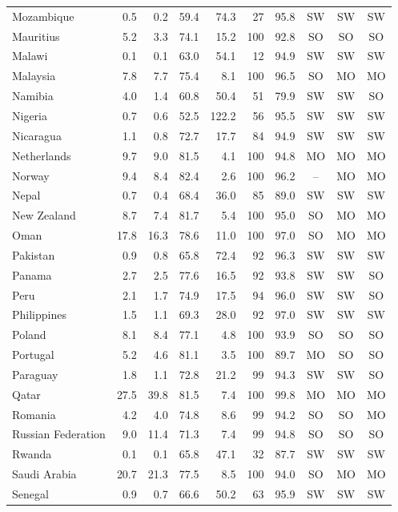 \begin{longtable}{@{}lrrrrrrccc@{}}
Mozambique & 0.5 & 0.2 & 59.4 & 74.3 & 27 & 95.8 & SW & SW & SW \\
Mauritius & 5.2 & 3.3 & 74.1 & 15.2 & 100 & 92.8 & SO & SO & SO \\
Malawi & 0.1 & 0.1 & 63.0 & 54.1 & 12 & 94.9 & SW & SW & SW \\
Malaysia & 7.8 & 7.7 & 75.4 & 8.1 & 100 & 96.5 & SO & MO & MO \\
Namibia & 4.0 & 1.4 & 60.8 & 50.4 & 51 & 79.9 & SW & SW & SO \\
Nigeria & 0.7 & 0.6 & 52.5 & 122.2 & 56 & 95.5 & SW & SW & SW \\
Nicaragua & 1.1 & 0.8 & 72.7 & 17.7 & 84 & 94.9 & SW & SW & SW \\
Netherlands & 9.7 & 9.0 & 81.5 & 4.1 & 100 & 94.8 & MO & MO & MO \\
Norway & 9.4 & 8.4 & 82.4 & 2.6 & 100 & 96.2 & -- & MO & MO \\
Nepal & 0.7 & 0.4 & 68.4 & 36.0 & 85 & 89.0 & SW & SW & SW \\
New Zealand & 8.7 & 7.4 & 81.7 & 5.4 & 100 & 95.0 & SO & MO & MO \\
Oman & 17.8 & 16.3 & 78.6 & 11.0 & 100 & 97.0 & SO & MO & MO \\
Pakistan & 0.9 & 0.8 & 65.8 & 72.4 & 92 & 96.3 & SW & SW & SW \\
Panama & 2.7 & 2.5 & 77.6 & 16.5 & 92 & 93.8 & SW & SW & SO \\
Peru & 2.1 & 1.7 & 74.9 & 17.5 & 94 & 96.0 & SW & SW & SO \\
Philippines & 1.5 & 1.1 & 69.3 & 28.0 & 92 & 97.0 & SW & SW & SW \\
Poland & 8.1 & 8.4 & 77.1 & 4.8 & 100 & 93.9 & SO & SO & SO \\
Portugal & 5.2 & 4.6 & 81.1 & 3.5 & 100 & 89.7 & MO & SO & SO \\
Paraguay & 1.8 & 1.1 & 72.8 & 21.2 & 99 & 94.3 & SW & SW & SO \\
Qatar & 27.5 & 39.8 & 81.5 & 7.4 & 100 & 99.8 & MO & MO & MO \\
Romania & 4.2 & 4.0 & 74.8 & 8.6 & 99 & 94.2 & SO & SO & MO \\
Russian Federation & 9.0 & 11.4 & 71.3 & 7.4 & 99 & 94.8 & SO & SO & SO \\
Rwanda & 0.1 & 0.1 & 65.8 & 47.1 & 32 & 87.7 & SW & SW & SW \\
Saudi Arabia & 20.7 & 21.3 & 77.5 & 8.5 & 100 & 94.0 & SO & MO & MO \\
Senegal & 0.9 & 0.7 & 66.6 & 50.2 & 63 & 95.9 & SW & SW & SW \\

\end{longtable}
